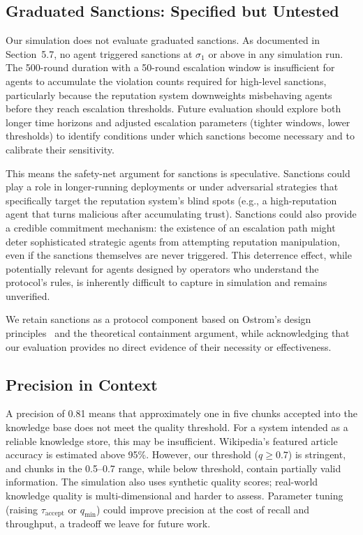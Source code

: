 \documentclass[11pt]{article}
\begin{document}
\subsection{Graduated Sanctions: Specified but Untested}

Our simulation does not evaluate graduated sanctions. As documented in Section~5.7, no agent triggered sanctions at $\sigma_1$ or above in any simulation run. The 500-round duration with a 50-round escalation window is insufficient for agents to accumulate the violation counts required for high-level sanctions, particularly because the reputation system downweights misbehaving agents before they reach escalation thresholds. Future evaluation should explore both longer time horizons and adjusted escalation parameters (tighter windows, lower thresholds) to identify conditions under which sanctions become necessary and to calibrate their sensitivity.

This means the safety-net argument for sanctions is speculative. Sanctions could play a role in longer-running deployments or under adversarial strategies that specifically target the reputation system's blind spots (e.g., a high-reputation agent that turns malicious after accumulating trust). Sanctions could also provide a credible commitment mechanism: the existence of an escalation path might deter sophisticated strategic agents from attempting reputation manipulation, even if the sanctions themselves are never triggered. This deterrence effect, while potentially relevant for agents designed by operators who understand the protocol's rules, is inherently difficult to capture in simulation and remains unverified.

We retain sanctions as a protocol component based on Ostrom's design principles~\cite{ostrom1990} and the theoretical containment argument, while acknowledging that our evaluation provides no direct evidence of their necessity or effectiveness.

\subsection{Precision in Context}

A precision of 0.81 means that approximately one in five chunks accepted into the knowledge base does not meet the quality threshold. For a system intended as a reliable knowledge store, this may be insufficient. Wikipedia's featured article accuracy is estimated above 95\%. However, our threshold ($q \geq 0.7$) is stringent, and chunks in the 0.5--0.7 range, while below threshold, contain partially valid information. The simulation also uses synthetic quality scores; real-world knowledge quality is multi-dimensional and harder to assess. Parameter tuning (raising $\tau_{\text{accept}}$ or $q_{\min}$) could improve precision at the cost of recall and throughput, a tradeoff we leave for future work.
\end{document}
